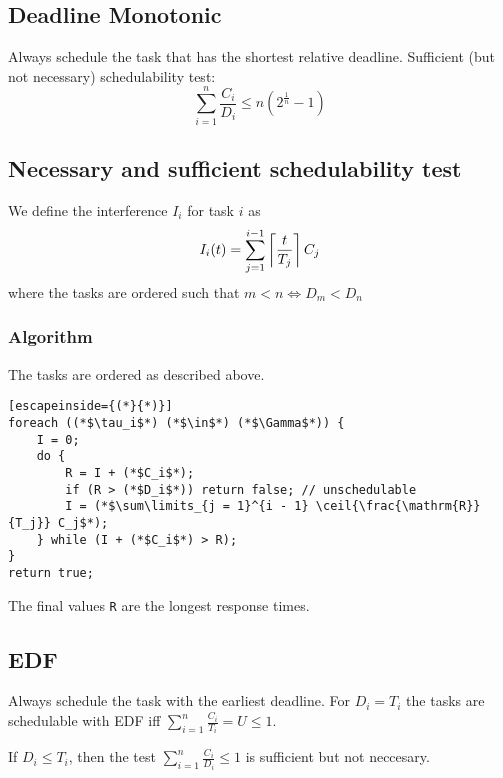 \subsection{Deadline Monotonic}
Always schedule the task that has the shortest relative deadline.
Sufficient (but not necessary) schedulability test:
\begin{equation*}
	\sum_{i = 1}^n \frac{C_i}{D_i} \leq n \left( 2^{\frac{1}{n}} - 1 \right)
\end{equation*}

\subsection{Necessary and sufficient schedulability test}
We define the interference $I_i$ for task $i$ as
\begin{equation*}
	I_i(t) = \sum_{j = 1}^{i - 1} \left\lceil \frac{t}{T_j} \right\rceil C_j
\end{equation*}
where the tasks are ordered such that $m < n \iff D_m < D_n$

\subsubsection{Algorithm}
The tasks are ordered as described above.
\begin{lstlisting}[escapeinside={(*}{*)}]
foreach ((*$\tau_i$*) (*$\in$*) (*$\Gamma$*)) {
	I = 0;
	do {
		R = I + (*$C_i$*);
		if (R > (*$D_i$*)) return false; // unschedulable
		I = (*$\sum\limits_{j = 1}^{i - 1} \ceil{\frac{\mathrm{R}}{T_j}} C_j$*);
	} while (I + (*$C_i$*) > R);
}
return true;
\end{lstlisting}
The final values \texttt{R} are the longest response times.

\subsection{EDF}
Always schedule the task with the earliest deadline.
For $D_i = T_i$ the tasks are schedulable with EDF iff
$\sum\limits_{i = 1}^{n} \frac{C_i}{T_i} = U \leq 1$.

If $D_i \leq T_i$, then the test
$\sum\limits_{i = 1}^{n} \frac{C_i}{D_i} \leq 1$ is sufficient but not
neccesary.
